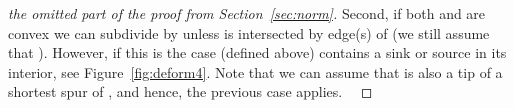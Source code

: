 \documentclass{llncs}
\def\qed{ \ \vrule width.2cm height.2cm depth0cm\smallskip}
\begin{document}
\begin{proof}[the omitted part of the proof from Section~\ref{sec:norm}]
   
Second, if both  and  are convex we can subdivide  by  unless  is intersected by edge(s) of  (we still assume that  ).
   However, if this is the case  (defined above) contains a sink or source  in its interior, see Figure~\ref{fig:deform4}. Note that we can assume that  is also a tip of a shortest spur of , and hence, the previous case applies.
\qed\end{proof}
\end{document}
